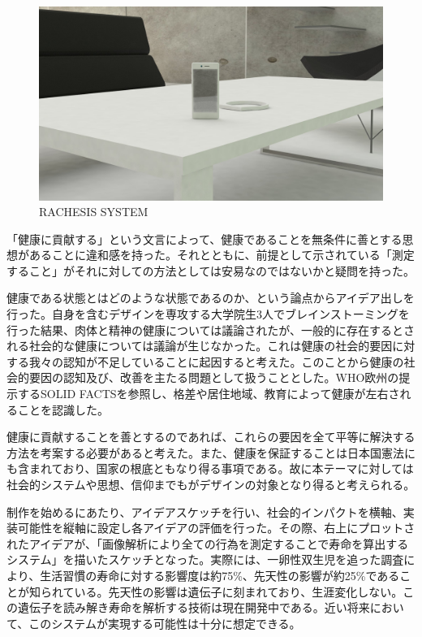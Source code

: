 \documentclass{jsarticle}
\begin{document}
\begin{figure}[H]
      \centering\includegraphics[width = 15cm]{./images/rachesis.jpg}
      \caption{RACHESIS SYSTEM}\label{fig:rachesis}
\end{figure}

「健康に貢献する」という文言によって、健康であることを無条件に善とする思想があることに違和感を持った。それとともに、前提として示されている「測定すること」がそれに対しての方法としては安易なのではないかと疑問を持った。

健康である状態とはどのような状態であるのか、という論点からアイデア出しを行った。自身を含むデザインを専攻する大学院生3人でブレインストーミングを行った結果、肉体と精神の健康については議論されたが、一般的に存在するとされる社会的な健康については議論が生じなかった。これは健康の社会的要因に対する我々の認知が不足していることに起因すると考えた。このことから健康の社会的要因の認知及び、改善を主たる問題として扱うこととした。WHO欧州の提示するSOLID FACTSを参照し、格差や居住地域、教育によって健康が左右されることを認識した。

健康に貢献することを善とするのであれば、これらの要因を全て平等に解決する方法を考案する必要があると考えた。また、健康を保証することは日本国憲法にも含まれており、国家の根底ともなり得る事項である。故に本テーマに対しては社会的システムや思想、信仰までもがデザインの対象となり得ると考えられる。

制作を始めるにあたり、アイデアスケッチを行い、社会的インパクトを横軸、実装可能性を縦軸に設定し各アイデアの評価を行った。その際、右上にプロットされたアイデアが、「画像解析により全ての行為を測定することで寿命を算出するシステム」を描いたスケッチとなった。実際には、一卵性双生児を追った調査により、生活習慣の寿命に対する影響度は約75\%、先天性の影響が約25\%であることが知られている。先天性の影響は遺伝子に刻まれており、生涯変化しない。この遺伝子を読み解き寿命を解析する技術は現在開発中である。近い将来において、このシステムが実現する可能性は十分に想定できる。
\end{document}
